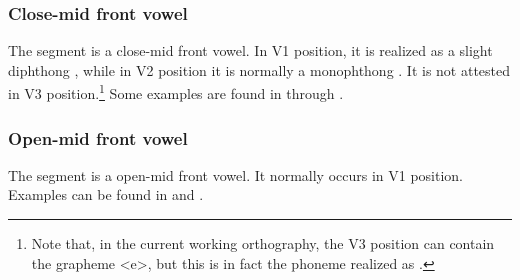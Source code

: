 \subsubsection{Close-mid front vowel}
The segment  is a close-mid front vowel. In V1 position, it is realized as a slight diphthong \ipa{[i͡e]}, while in V2 position it is normally a monophthong \ipa{[e]}. It is not attested in V3 position.\footnote{Note that, in the current working orthography, the V3 position can contain the grapheme <e>, but this is in fact the phoneme  realized as \ipa{[ɪ]}.} 
Some examples are found in  through .




\subsubsection{Open-mid front vowel}\label{openE}
The segment  is a open-mid front vowel. It normally occurs in V1 position. %
Examples can be found in  and .

